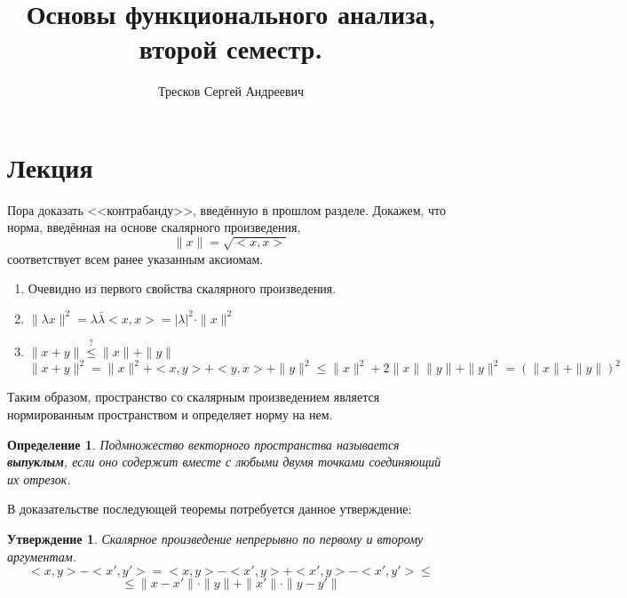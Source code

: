 \documentclass[12pt]{article}
\newcommand{\norm}[1]{\| #1 \|}
\renewcommand{\leq}{\leqslant}
\newtheorem{defi}{Определение}[section]
\newtheorem{state}{Утверждение}[section] %
\begin{document}
	\title{Основы функционального анализа, второй семестр.}
	\author{Тресков Сергей Андреевич}
	\maketitle
	
	\section{Лекция}
	
    Пора доказать <<контрабанду>>, введённую в прошлом разделе. Докажем, что норма, введённая на основе скалярного произведения, 
    $$\| x \| = \sqrt{<x,x>}$$
    соответствует всем ранее указанным аксиомам.

    \begin{enumerate}
    \item Очевидно из первого свойства скалярного произведения.
    \item $\norm{\lambda x}^2 = \lambda \bar{\lambda} <x, x> = | \lambda |^2 \cdot \norm{x}^2$
    \item $\norm{x+y} \overset{?}{\leq} \norm{x} + \norm{y}$
	      $$\norm{x + y}^2 = \norm{x}^2 + <x,y> + <y,x> + \norm{y}^2 \leq \norm{x}^2 + 2 \norm{x} \norm{y} + \norm{y}^2
			= (\norm{x} + \norm{y})^2
	      $$
    \end{enumerate}
	Таким образом, пространство со скалярным произведением является нормированным пространством и определяет норму на нем.
	
	\begin{defi}
		Подмножество векторного пространства называется \textbf{выпуклым}, если оно содержит вместе с любыми двумя 
		точками соединяющий их отрезок.
	\end{defi}

	В доказательстве последующей теоремы потребуется данное утверждение:
	\begin{state}
		Скалярное произведение непрерывно по первому и второму аргументам.
		$$<x, y> - <x', y'> = <x, y> - <x', y> + <x', y> - <x', y'> \leq$$
		$$\leq \norm{x - x'}\cdot \norm{y} + \norm{x'} \cdot \norm{y - y'}$$
	\end{state}
	
\end{document}
